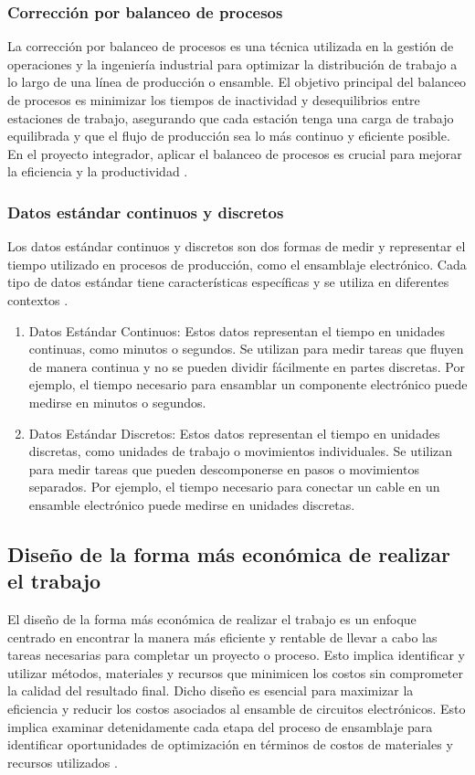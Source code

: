 \subsubsection{Corrección por balanceo de procesos}
%
La corrección por balanceo de procesos es una técnica utilizada en la gestión de operaciones y la ingeniería industrial para optimizar la distribución de trabajo a lo largo de una línea de producción o ensamble. El objetivo principal del balanceo de procesos es minimizar los tiempos de inactividad y desequilibrios entre estaciones de trabajo, asegurando que cada estación tenga una carga de trabajo equilibrada y que el flujo de producción sea lo más continuo y eficiente posible. En el proyecto integrador, aplicar el balanceo de procesos es crucial para mejorar la eficiencia y la productividad  \cite{balanceo-procesos}.
% 
\subsubsection{Datos estándar continuos y discretos}
% 
Los datos estándar continuos y discretos son dos formas de medir y representar el tiempo utilizado en procesos de producción, como el ensamblaje electrónico. Cada tipo de datos estándar tiene características específicas y se utiliza en diferentes contextos \cite{datos-estandar}.

\begin{enumerate}
    \item Datos Estándar Continuos: Estos datos representan el tiempo en unidades continuas, como minutos o segundos. Se utilizan para medir tareas que fluyen de manera continua y no se pueden dividir fácilmente en partes discretas. Por ejemplo, el tiempo necesario para ensamblar un componente electrónico puede medirse en minutos o segundos.

    \item Datos Estándar Discretos: Estos datos representan el tiempo en unidades discretas, como unidades de trabajo o movimientos individuales. Se utilizan para medir tareas que pueden descomponerse en pasos o movimientos separados. Por ejemplo, el tiempo necesario para conectar un cable en un ensamble electrónico puede medirse en unidades discretas.
 
\end{enumerate}
% 
\subsection{Diseño de la forma más económica de realizar el trabajo}
% 
El diseño de la forma más económica de realizar el trabajo es un enfoque centrado en encontrar la manera más eficiente y rentable de llevar a cabo las tareas necesarias para completar un proyecto o proceso. Esto implica identificar y utilizar métodos, materiales y recursos que minimicen los costos sin comprometer la calidad del resultado final. Dicho diseño es esencial para maximizar la eficiencia y reducir los costos asociados al ensamble de circuitos electrónicos. Esto implica examinar detenidamente cada etapa del proceso de ensamblaje para identificar oportunidades de optimización en términos de costos de materiales y recursos utilizados \cite{diseno-economico}.
% 
